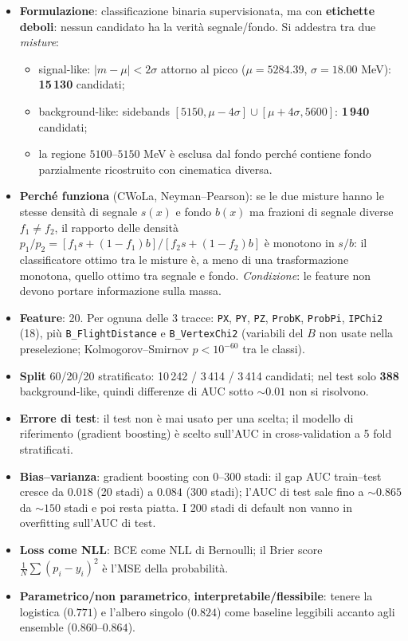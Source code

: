 \documentclass[11pt,a4paper]{article}
\newcommand{\code}[1]{\texttt{#1}}
\begin{document}
\begin{itemize}
\item \textbf{Formulazione}: classificazione binaria supervisionata, ma con \textbf{etichette deboli}: nessun candidato ha la verit\`a segnale/fondo. Si addestra tra due \emph{misture}:
 \begin{itemize}
 \item signal-like: $|m-\mu|<2\sigma$ attorno al picco ($\mu=5284.39$, $\sigma=18.00$ MeV): \textbf{15\,130} candidati;
 \item background-like: sidebands $[5150,\mu-4\sigma]\cup[\mu+4\sigma,5600]$: \textbf{1\,940} candidati;
 \item la regione $5100$--$5150$ MeV \`e esclusa dal fondo perch\'e contiene fondo parzialmente ricostruito con cinematica diversa.
 \end{itemize}
\item \textbf{Perch\'e funziona} (CWoLa, Neyman--Pearson): se le due misture hanno le stesse densit\`a di segnale $s(x)$ e fondo $b(x)$ ma frazioni di segnale diverse $f_1\neq f_2$, il rapporto delle densit\`a $p_1/p_2=[f_1s+(1-f_1)b]/[f_2s+(1-f_2)b]$ \`e monotono in $s/b$: il classificatore ottimo tra le misture \`e, a meno di una trasformazione monotona, quello ottimo tra segnale e fondo. \emph{Condizione}: le feature non devono portare informazione sulla massa.
\item \textbf{Feature}: 20. Per ognuna delle 3 tracce: \code{PX}, \code{PY}, \code{PZ}, \code{ProbK}, \code{ProbPi}, \code{IPChi2} (18), pi\`u \code{B\_FlightDistance} e \code{B\_VertexChi2} (variabili del $B$ non usate nella preselezione; Kolmogorov--Smirnov $p<10^{-60}$ tra le classi).
\item \textbf{Split} 60/20/20 stratificato: 10\,242 / 3\,414 / 3\,414 candidati; nel test solo \textbf{388} background-like, quindi differenze di AUC sotto $\sim0.01$ non si risolvono.
\item \textbf{Errore di test}: il test non \`e mai usato per una scelta; il modello di riferimento (gradient boosting) \`e scelto sull'AUC in cross-validation a 5 fold stratificati.
\item \textbf{Bias--varianza}: gradient boosting con $0$--$300$ stadi: il gap AUC train--test cresce da $0.018$ (20 stadi) a $0.084$ (300 stadi); l'AUC di test sale fino a $\sim0.865$ da $\sim150$ stadi e poi resta piatta. I 200 stadi di default non vanno in overfitting sull'AUC di test.
\item \textbf{Loss come NLL}: BCE come NLL di Bernoulli; il Brier score $\frac1N\sum(p_i-y_i)^2$ \`e l'MSE della probabilit\`a.
\item \textbf{Parametrico/non parametrico}, \textbf{interpretabile/flessibile}: tenere la logistica ($0.771$) e l'albero singolo ($0.824$) come baseline leggibili accanto agli ensemble ($0.860$--$0.864$).
\end{itemize}
\end{document}
